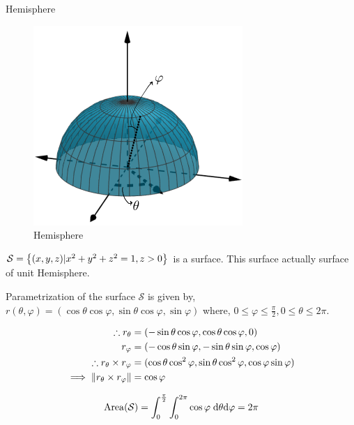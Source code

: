 \documentclass[../Analysis-3]{subfiles}
\begin{document}
\begin{Eg}{Hemisphere}{}

    \begin{figure}
        \centering
        \includegraphics[width=.78\linewidth]{../figures/lec-26.2.png}
        \caption{Hemisphere}
    \end{figure}

    $\mathcal{S} = \qty{(x,y,z) | x^2+y^2+z^2 = 1, z >0 }$ is a surface. This surface actually surface of unit Hemisphere.

    Parametrization of the surface $\mathcal{S}$ is given by, $r(\theta, \varphi) = (\cos \theta \cos \varphi, \sin \theta \cos \varphi, \sin \varphi)$ where, $0 \le \varphi \le \frac{\pi}{2}, 0 \le \theta \le 2\pi$.

    \begin{align*}
        \therefore r_{\theta}                         & = (-\sin \theta \cos \varphi, \cos \theta \cos \varphi, 0)                              \\
        r_{\varphi}                                   & = (-\cos \theta \sin \varphi,-\sin \theta \sin \varphi, \cos \varphi)                   \\
        \therefore r_{\theta} \times r_{\varphi}      & = (\cos \theta \cos ^2 \varphi, \sin \theta \cos ^2\varphi, \cos \varphi  \sin \varphi) \\
        \implies \norm{r_{\theta} \times r_{\varphi}} & = \cos \varphi
    \end{align*}

    \[\operatorname{Area}(\mathcal{S}) = \int_{0}^{\frac{\pi}{2}}\int_{0}^{2\pi} \cos \varphi \hspace{0.1cm} \dd \theta \dd \varphi = 2\pi \]

\end{Eg}
\end{document}
